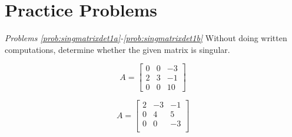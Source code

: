 \documentclass{ximera}
\begin{document}






\section*{Practice Problems}
\emph{Problems \ref{prob:singmatrixdet1a}-\ref{prob:singmatrixdet1b}}
Without doing written computations, determine whether the given matrix is singular. 

  \begin{problem}\label{prob:singmatrixdet1a}
  $$A=\begin{bmatrix}0&0&-3\\2&3&-1\\0&0&10\end{bmatrix}$$
  \begin{multipleChoice}
  \end{multipleChoice}
  \end{problem}

\begin{problem}\label{prob:singmatrixdet1b}
  $$A=\begin{bmatrix}2&-3&-1\\0&4&5\\0&0&-3\\\end{bmatrix}$$
  \begin{multipleChoice}
  \end{multipleChoice}
  \end{problem}
\end{document}
